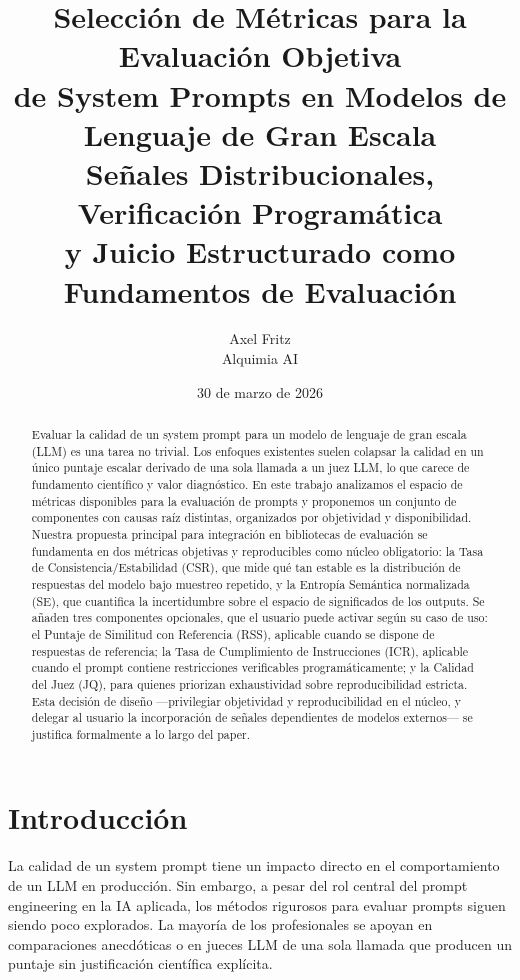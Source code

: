 \documentclass[11pt,a4paper]{article}
\title{
    \vspace{-1cm}
    \textbf{Selección de Métricas para la Evaluación Objetiva\\
    de System Prompts en Modelos de Lenguaje de Gran Escala}\\
    \vspace{0.4cm}
    \large Señales Distribucionales, Verificación Programática\\
    y Juicio Estructurado como Fundamentos de Evaluación
}
\author{
    Axel Fritz\\
    Alquimia AI
}
\date{30 de marzo de 2026}
\begin{document}
\maketitle

\begin{abstract}
Evaluar la calidad de un system prompt para un modelo de lenguaje de gran escala (LLM) es una tarea no trivial. Los enfoques existentes suelen colapsar la calidad en un único puntaje escalar derivado de una sola llamada a un juez LLM, lo que carece de fundamento científico y valor diagnóstico. En este trabajo analizamos el espacio de métricas disponibles para la evaluación de prompts y proponemos un conjunto de componentes con causas raíz distintas, organizados por objetividad y disponibilidad. Nuestra propuesta principal para integración en bibliotecas de evaluación se fundamenta en dos métricas objetivas y reproducibles como núcleo obligatorio: la Tasa de Consistencia/Estabilidad (CSR), que mide qué tan estable es la distribución de respuestas del modelo bajo muestreo repetido, y la Entropía Semántica normalizada (SE), que cuantifica la incertidumbre sobre el espacio de significados de los outputs. Se añaden tres componentes opcionales, que el usuario puede activar según su caso de uso: el Puntaje de Similitud con Referencia (RSS), aplicable cuando se dispone de respuestas de referencia; la Tasa de Cumplimiento de Instrucciones (ICR), aplicable cuando el prompt contiene restricciones verificables programáticamente; y la Calidad del Juez (JQ), para quienes priorizan exhaustividad sobre reproducibilidad estricta. Esta decisión de diseño ---privilegiar objetividad y reproducibilidad en el núcleo, y delegar al usuario la incorporación de señales dependientes de modelos externos--- se justifica formalmente a lo largo del paper.
\end{abstract}

\section{Introducción}

La calidad de un system prompt tiene un impacto directo en el comportamiento de un LLM en producción. Sin embargo, a pesar del rol central del prompt engineering en la IA aplicada, los métodos rigurosos para evaluar prompts siguen siendo poco explorados. La mayoría de los profesionales se apoyan en comparaciones anecdóticas o en jueces LLM de una sola llamada que producen un puntaje sin justificación científica explícita.
\end{document}
